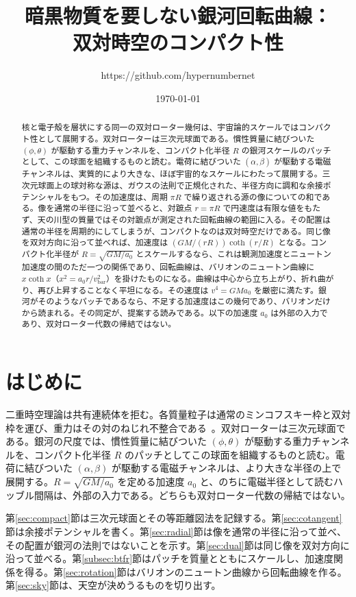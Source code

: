 \documentclass[a4paper]{article}
\title{暗黒物質を要しない銀河回転曲線：\\
双対時空のコンパクト性}
\author{https://github.com/hypernumbernet}
\date{\today}
\begin{document}
\maketitle

\begin{abstract}
核と電子殻を層状にする同一の双対ローター幾何は、宇宙論的スケールではコンパクト性として展開する。双対ローターは三次元球面である。慣性質量に結びついた $(\phi,\theta)$ が駆動する重力チャンネルを、コンパクト化半径 $R$ の銀河スケールのパッチとして、この球面を組織するものと読む。電荷に結びついた $(\alpha,\beta)$ が駆動する電磁チャンネルは、実質的により大きな、ほぼ宇宙的なスケールにわたって展開する。三次元球面上の球対称な源は、ガウスの法則で正規化された、半径方向に調和な余接ポテンシャルをもつ。その加速度は、周期 $\pi R$ で繰り返される源の像についての和である。像を通常の半径に沿って並べると、対蹠点 $r=\pi R$ で円速度は有限な値をもたず、天の川型の質量ではその対蹠点が測定された回転曲線の範囲に入る。その配置は通常の半径を周期的にしてしまうが、コンパクトなのは双対時空だけである。同じ像を双対方向に沿って並べれば、加速度は $(GM/(rR))\coth(r/R)$ となる。コンパクト化半径が $R=\sqrt{GM/a_0}$ とスケールするなら、これは観測加速度とニュートン加速度の間のただ一つの関係であり、回転曲線は、バリオンのニュートン曲線に $x\coth x$（$x^2=a_0r/v_{\text{bar}}^2$）を掛けたものになる。曲線は中心から立ち上がり、折れ曲がり、再び上昇することなく平坦になる。その速度は $v^4=GMa_0$ を厳密に満たす。銀河がそのようなパッチであるなら、不足する加速度はこの幾何であり、バリオンだけから読まれる。その同定が、提案する読みである。以下の加速度 $a_0$ は外部の入力であり、双対ローター代数の帰結ではない。
\end{abstract}

\section{はじめに}
\label{sec:introduction}

二重時空理論は共有連続体を拒む。各質量粒子は通常のミンコフスキー枠と双対枠を運び、重力はその対のねじれ不整合である~\cite{dst-main}。双対ローターは三次元球面である。銀河の尺度では、慣性質量に結びついた $(\phi,\theta)$ が駆動する重力チャンネルを、コンパクト化半径 $R$ のパッチとしてこの球面を組織するものと読む。電荷に結びついた $(\alpha,\beta)$ が駆動する電磁チャンネルは、より大きな半径の上で展開する。$R=\sqrt{GM/a_0}$ を定める加速度 $a_0$ と、のちに電磁半径として読むハッブル間隔は、外部の入力である。どちらも双対ローター代数の帰結ではない。

第\ref{sec:compact}節は三次元球面とその等距離図法を記録する。第\ref{sec:cotangent}節は余接ポテンシャルを書く。第\ref{sec:radial}節は像を通常の半径に沿って並べ、その配置が銀河の法則ではないことを示す。第\ref{sec:dual}節は同じ像を双対方向に沿って並べる。第\ref{subsec:btfr}節はパッチを質量とともにスケールし、加速度関係を得る。第\ref{sec:rotation}節はバリオンのニュートン曲線から回転曲線を作る。第\ref{sec:sky}節は、天空が決めうるものを切り出す。
\end{document}
